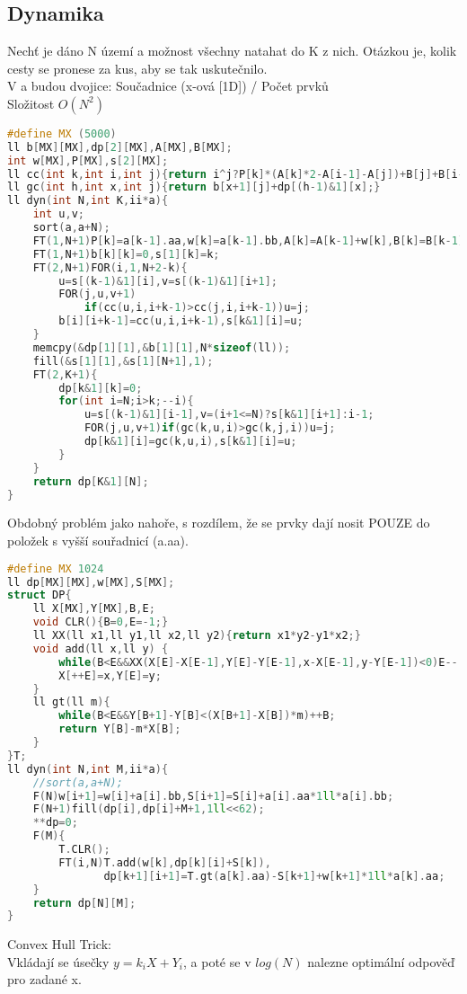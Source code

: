 \documentclass[11pt]{article}
\begin{document}
\subsection{Dynamika}
Nechť je dáno \textsf{N} území a možnost všechny natahat do \textsf{K} z nich. Otázkou je, kolik cesty se pronese za kus, aby se tak uskutečnilo.
\\V \textsf{a} budou dvojice: Součadnice (x-ová [1D]) / Počet prvků
\\Složitost $O(N^2)$
\begin{lstlisting}[language=C++]
#define MX (5000)
ll b[MX][MX],dp[2][MX],A[MX],B[MX];
int w[MX],P[MX],s[2][MX];
ll cc(int k,int i,int j){return i^j?P[k]*(A[k]*2-A[i-1]-A[j])+B[j]+B[i-1]-B[k]*2:0;}
ll gc(int h,int x,int j){return b[x+1][j]+dp[(h-1)&1][x];}
ll dyn(int N,int K,ii*a){
    int u,v;
    sort(a,a+N);
    FT(1,N+1)P[k]=a[k-1].aa,w[k]=a[k-1].bb,A[k]=A[k-1]+w[k],B[k]=B[k-1]+P[k]*1ll*w[k];
    FT(1,N+1)b[k][k]=0,s[1][k]=k;
    FT(2,N+1)FOR(i,1,N+2-k){
        u=s[(k-1)&1][i],v=s[(k-1)&1][i+1];
        FOR(j,u,v+1)
            if(cc(u,i,i+k-1)>cc(j,i,i+k-1))u=j;
        b[i][i+k-1]=cc(u,i,i+k-1),s[k&1][i]=u;
    }
    memcpy(&dp[1][1],&b[1][1],N*sizeof(ll));
    fill(&s[1][1],&s[1][N+1],1);
    FT(2,K+1){
        dp[k&1][k]=0;
        for(int i=N;i>k;--i){
            u=s[(k-1)&1][i-1],v=(i+1<=N)?s[k&1][i+1]:i-1;
            FOR(j,u,v+1)if(gc(k,u,i)>gc(k,j,i))u=j;
            dp[k&1][i]=gc(k,u,i),s[k&1][i]=u;
        }
    }
    return dp[K&1][N];
}
\end{lstlisting}
Obdobný problém jako nahoře, s rozdílem, že se prvky dají nosit POUZE do položek s vyšší souřadnicí (a.aa).
\begin{lstlisting}[language=C++]
#define MX 1024
ll dp[MX][MX],w[MX],S[MX];
struct DP{
    ll X[MX],Y[MX],B,E;
    void CLR(){B=0,E=-1;}
    ll XX(ll x1,ll y1,ll x2,ll y2){return x1*y2-y1*x2;}
    void add(ll x,ll y) {
        while(B<E&&XX(X[E]-X[E-1],Y[E]-Y[E-1],x-X[E-1],y-Y[E-1])<0)E--;
        X[++E]=x,Y[E]=y;
    }
    ll gt(ll m){
        while(B<E&&Y[B+1]-Y[B]<(X[B+1]-X[B])*m)++B;
        return Y[B]-m*X[B];
    }
}T;
ll dyn(int N,int M,ii*a){
	//sort(a,a+N);
    F(N)w[i+1]=w[i]+a[i].bb,S[i+1]=S[i]+a[i].aa*1ll*a[i].bb;
    F(N+1)fill(dp[i],dp[i]+M+1,1ll<<62);
    **dp=0;
    F(M){
        T.CLR();
        FT(i,N)T.add(w[k],dp[k][i]+S[k]),
               dp[k+1][i+1]=T.gt(a[k].aa)-S[k+1]+w[k+1]*1ll*a[k].aa;
    }
    return dp[N][M];
}
\end{lstlisting}
Convex Hull Trick:
\\Vkládají se úsečky $y=k_iX+Y_i$, a poté se v $log(N)$ nalezne optimální odpověď pro zadané \textsf{x}.
\end{document}
